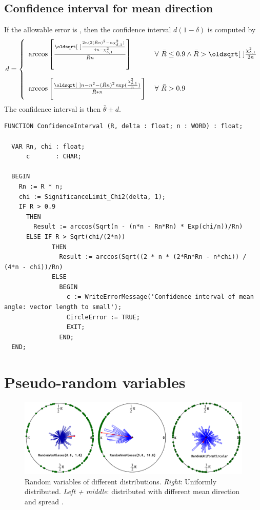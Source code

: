 \begin{refsection}
\subsection{Confidence interval for mean direction}

If the allowable error is \skalar{\delta}, then the confidence interval \( d(1 - \delta) \) is computed by
\begin{equation}
  d = \left\{
          \begin{array}{l@{\;}l}
             \arccos\left[\frac{\sqrt{\frac{2 n (2 {(\bar{R} n)^2 - n \chi^2_{\delta,1}})}{4 n - \chi^2_{\delta,1}}}}{\bar{R} n} \right]    & \quad \forall\ \bar{R} \leq 0.9 \wedge \bar{R} > \sqrt{\frac{\chi^2_{\delta,1}}{2n}} \\
              & \\
             \arccos\left[\frac{\sqrt{n - {n^2 - (\bar{R} n)^2} \exp(\frac{\chi^2_{\delta,1}}{n})}}{\bar{R} * n} \right]    & \quad \forall\ \bar{R} > 0.9 \\
          \end{array}
        \right.
\end{equation}
The confidence interval is then \( \bar{\theta} \pm d \).

\begin{lstlisting}[caption=Confidence interval of circular mean]
  FUNCTION ConfidenceInterval (R, delta : float; n : WORD) : float;

  VAR Rn, chi : float;
      c       : CHAR;

  BEGIN
    Rn := R * n;
    chi := SignificanceLimit_Chi2(delta, 1);
    IF R > 0.9
      THEN
        Result := arccos(Sqrt(n - (n*n - Rn*Rn) * Exp(chi/n))/Rn)
      ELSE IF R > Sqrt(chi/(2*n))
             THEN
               Result := arccos(Sqrt((2 * n * (2*Rn*Rn - n*chi)) / (4*n - chi))/Rn)
             ELSE
               BEGIN
                 c := WriteErrorMessage('Confidence interval of mean angle: vector length to small');
                 CircleError := TRUE;
                 EXIT;
               END;
  END;
\end{lstlisting}

\section{Pseudo-random variables }

\begin{figure}
 \caption{\capstart Random variables of different distributions. \emph{Right}: Uniformly distributed. \emph{Left + middle}:  distributed with different mean direction \skalar{\bar{\theta}} and spread \skalar{\kappa}.}
 \label{fig:CircRand}
 \centering
 \includegraphics[width=\textwidth]{Graphics/c1-mean}
\end{figure}



\end{refsection}

